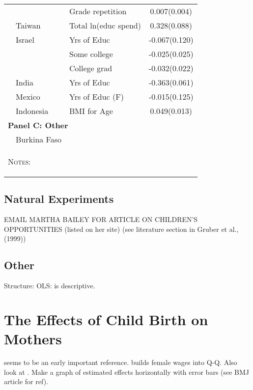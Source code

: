 \begin{table}
\begin{tabular}{lllc}
                                 &         &Grade repetition     &0.007(0.004)  \\
\citet{Lee2008}                  &Taiwan   &Total ln(educ spend) &0.328(0.088)  \\
\citet{Angristetal2010}          &Israel   &Yrs of Educ          & -0.067(0.120)\\
                                 &         &Some college         & -0.025(0.025)\\
                                 &         &College grad         & -0.032(0.022)\\
\citet{KumarKugler2011}          &India    &Yrs of Educ          & -0.363(0.061)\\
\citet{FitzsimonsMalde2014}      &Mexico   &Yrs of Educ (F)      & -0.015(0.125)\\ 
\citet{MillimetWang2011}         &Indonesia&BMI for Age          &  0.049(0.013)\\
\midrule
\multicolumn{4}{l}{\textbf{Panel C: Other}} \\
\citet{Bougmaetal2015}           &Burkina Faso&&\\ \bottomrule
\multicolumn{4}{p{10cm}}{\begin{footnotesize}\textsc{Notes:} \end{footnotesize}}
\end{tabular}     
\end{table}

\subsection{Natural Experiments}
EMAIL MARTHA BAILEY FOR ARTICLE ON CHILDREN'S OPPORTUNITIES (listed on her site)
\citet{OltmansHungerman2012, Gruberetal1999,PopEleches2006,BleakleyLange2009,
RosenzweigZhang2009, Qian2009,Hossain1989}
(see literature section in Gruber et al., (1999))

\subsection{Other}
Structure: \citet{RosenzweigWolpin1995,RosenzweigSchultz1985,
RosenzweigWolpin1980b}
OLS: \citet{Hanushek1992} is descriptive. \citet{Desai1995}


\section{The Effects of Child Birth on Mothers}
\citet{FleisherRhodes1979} seems to be an early important reference. 
\citet{Willis1973} builds female wages into Q-Q.  Also look at \citet{Reuben1973}.
Make a graph of estimated effects horizontally with error bars (see BMJ 
article for ref).

